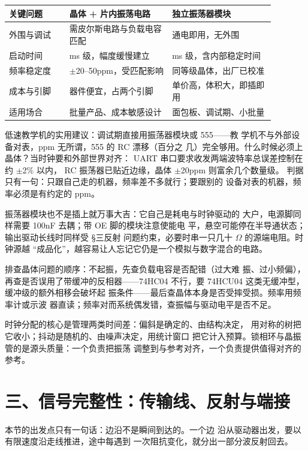 \begin{longtable}{L{0.2\linewidth}L{0.34\linewidth}L{0.34\linewidth}}
\toprule
关键问题 & 晶体 + 片内振荡电路 & 独立振荡器模块 \\
\midrule
外围与调试 & 需皮尔斯电路与负载电容匹配 & 通电即用，无外围 \\
启动时间 & ms 级，幅度缓慢建立 & ms 级，含内部稳定时间 \\
频率稳定度 & $\pm$20--50ppm，受匹配影响 & 同等级晶体，出厂已校准 \\
成本与引脚 & 器件便宜，占两个引脚 & 单价高，体积大，即插即用 \\
适用场合 & 批量产品、成本敏感设计 & 面包板、调试期、小批量 \\
\bottomrule
\end{longtable}

低速教学机的实用建议：调试期直接用振荡器模块或 555——教
学机不与外部设备对表，ppm 无所谓，555 的 RC 漂移（百分之
几）完全够用。什么时候必须上晶体？当时钟要和外部世界对齐：
UART 串口要求收发两端波特率总误差控制在约 $\pm$2\% 以内，
RC 振荡器已贴近边缘，晶体 $\pm$20ppm 则富余几个数量级。
判据只有一句：只跟自己走的机器，频率差不多就行；要跟别的
设备对表的机器，频率必须是有约定的 ppm。

振荡器模块也不是插上就万事大吉：它自己是耗电与时钟驱动的
大户，电源脚同样需要 100nF 去耦；带 OE 脚的模块注意使能电
平，悬空可能停在半导通状态；输出驱动长线时同样受 §三反射
问题约束，必要时串一只几十 $\Omega$ 的源端电阻。时钟源越
“成品化”，越容易让人忘记它仍是一个模拟与数字混合的电路。

排查晶体问题的顺序：不起振，先查负载电容是否配错（过大难
振、过小频偏），再查是否误用了带缓冲的反相器——74HC04
不行，要 74HCU04 这类无缓冲型，缓冲级的额外相移会破坏起
振条件——最后查晶体本身是否受摔受损。频率用频率计或示波
器直读；频率对而系统偶发错，查振幅与驱动电平是否不足。

\begin{keyidea}
时钟分配的核心是管理两类时间差：偏斜是确定的、由结构决定，
用对称的树把它收小；抖动是随机的、由噪声决定，用统计窗口
把它计入预算。锁相环与晶振管的是源头质量：一个负责把振荡
调整到与参考对齐，一个负责提供值得对齐的参考。
\end{keyidea}

\section{三、信号完整性：传输线、反射与端接}

本节的出发点只有一句话：边沿不是瞬间到达的。一个边
沿从驱动器出发，要以有限速度沿走线推进，途中每遇到
一次阻抗变化，就分出一部分波反射回去。

